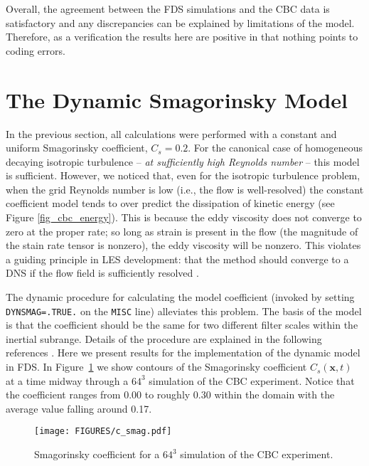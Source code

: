 \documentclass[11pt]{book}
\begin{document}
Overall, the agreement between the FDS simulations and the CBC data is satisfactory and any discrepancies can be explained by limitations of the model.  Therefore, as a verification the results here are positive in that nothing points to coding errors.




\clearpage

\section{The Dynamic Smagorinsky Model}
\label{dynamic_smagorinsky_model}

In the previous section, all calculations were performed with a constant and uniform Smagorinsky coefficient, $C_s = 0.2$.  For the canonical case of homogeneous decaying isotropic turbulence -- \emph{at sufficiently high Reynolds number} -- this model is sufficient.  However, we noticed that, even for the isotropic turbulence problem, when the grid Reynolds number is low (i.e., the flow is well-resolved) the constant coefficient model tends to over predict the dissipation of kinetic energy (see Figure \ref{fig_cbc_energy}).  This is because the eddy viscosity does not converge to zero at the proper rate; so long as strain is present in the flow (the magnitude of the stain rate tensor is nonzero), the eddy viscosity will be nonzero.  This violates a guiding principle in LES development: that the method should converge to a DNS if the flow field is sufficiently resolved \cite{McDermott:2007}.

The dynamic procedure for calculating the model coefficient (invoked by setting {\tt DYNSMAG=.TRUE.} on the {\tt MISC} line) alleviates this problem.  The basis of the model is that the coefficient should be the same for two different filter scales within the inertial subrange.  Details of the procedure are explained in the following references \cite{Germano:1991,PinoMartin:2000,Moin:1991,Lund:1997,McDermott:2004}.  Here we present results for the implementation of the dynamic model in FDS.  In Figure~\ref{fig_c_smag} we show contours of the Smagorinsky coefficient $C_s(\mathbf{x},t)$ at a time midway through a $64^3$ simulation of the CBC experiment.  Notice that the coefficient ranges from 0.00 to roughly 0.30 within the domain with the average value falling around 0.17.

\begin{figure}[t]
   \begin{center}
      \texttt{[image: FIGURES/c\_smag.pdf]}
      \caption{\label{fig_c_smag} \small Smagorinsky coefficient for a $64^3$ simulation of the CBC experiment.}
   \end{center}
\end{figure}
\end{document}
